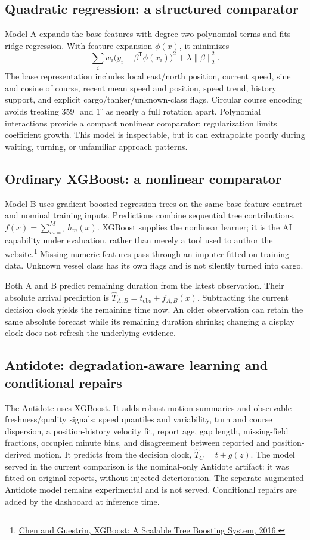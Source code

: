 \documentclass[11pt]{article}
\begin{document}
\subsection{Quadratic regression: a structured comparator}
Model A expands the base features with degree-two polynomial terms and fits ridge regression. With feature expansion $\phi(x)$, it minimizes
\[
 \sum_i w_i\bigl(y_i-\beta^\mathsf T\phi(x_i)\bigr)^2
 +\lambda\lVert\beta\rVert_2^2.
\]
The base representation includes local east/north position, current speed, sine and cosine of course, recent mean speed and position, speed trend, history support, and explicit cargo/tanker/unknown-class flags. Circular course encoding avoids treating $359^\circ$ and $1^\circ$ as nearly a full rotation apart. Polynomial interactions provide a compact nonlinear comparator; regularization limits coefficient growth. This model is inspectable, but it can extrapolate poorly during waiting, turning, or unfamiliar approach patterns.

\subsection{Ordinary XGBoost: a nonlinear comparator}
Model B uses gradient-boosted regression trees on the same base feature contract and nominal training inputs. Predictions combine sequential tree contributions, $f(x)=\sum_{m=1}^{M}h_m(x)$. XGBoost supplies the nonlinear learner; it is the AI capability under evaluation, rather than merely a tool used to author the website.\footnote{\href{https://arxiv.org/abs/1603.02754}{Chen and Guestrin, XGBoost: A Scalable Tree Boosting System, 2016.}} Missing numeric features pass through an imputer fitted on training data. Unknown vessel class has its own flags and is not silently turned into cargo.

Both A and B predict remaining duration from the latest observation. Their absolute arrival prediction is $\widehat T_{A,B}=t_{\mathrm{obs}}+f_{A,B}(x)$. Subtracting the current decision clock yields the remaining time now. An older observation can retain the same absolute forecast while its remaining duration shrinks; changing a display clock does not refresh the underlying evidence.

\subsection{Antidote: degradation-aware learning and conditional repairs}
The Antidote uses XGBoost. It adds robust motion summaries and observable freshness/quality signals: speed quantiles and variability, turn and course dispersion, a position-history velocity fit, report age, gap length, missing-field fractions, occupied minute bins, and disagreement between reported and position-derived motion. It predicts from the decision clock, $\widehat T_C=t+g(z)$. The model served in the current comparison is the nominal-only Antidote artifact: it was fitted on original reports, without injected deterioration. The separate augmented Antidote model remains experimental and is not served. Conditional repairs are added by the dashboard at inference time.
\end{document}
